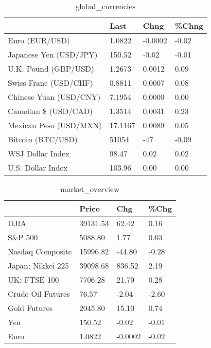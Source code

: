 \documentclass{article}%
\begin{document}
%


\begin{table}[htbp]%
\caption{global\_currencies}%
\centering%
\begin{adjustbox}{width=1\textwidth}%
\begin{tabular}{llll}
\toprule
                       &    Last &    Chng & \%Chng \\
\midrule
        Euro (EUR/USD) &  1.0822 & -0.0002 & -0.02 \\
Japanese Yen (USD/JPY) &  150.52 &   -0.02 & -0.01 \\
  U.K. Pound (GBP/USD) &  1.2673 &  0.0012 &  0.09 \\
 Swiss Franc (USD/CHF) &  0.8811 &  0.0007 &  0.08 \\
Chinese Yuan (USD/CNY) &  7.1954 &  0.0000 &  0.00 \\
  Canadian \$ (USD/CAD) &  1.3514 &  0.0031 &  0.23 \\
Mexican Peso (USD/MXN) & 17.1167 &  0.0089 &  0.05 \\
     Bitcoin (BTC/USD) &   51054 &     -47 & -0.09 \\
      WSJ Dollar Index &   98.47 &    0.02 &  0.02 \\
     U.S. Dollar Index &  103.96 &    0.00 &  0.00 \\
\bottomrule
\end{tabular}
%
\end{adjustbox}%
\end{table}

%


\begin{table}[htbp]%
\caption{market\_overview}%
\centering%
\begin{adjustbox}{width=1\textwidth}%
\begin{tabular}{llll}
\toprule
                  &    Price &     Chg &  \%Chg \\
\midrule
             DJIA & 39131.53 &   62.42 &  0.16 \\
          S\&P 500 &  5088.80 &    1.77 &  0.03 \\
 Nasdaq Composite & 15996.82 &  -44.80 & -0.28 \\
Japan: Nikkei 225 & 39098.68 &  836.52 &  2.19 \\
     UK: FTSE 100 &  7706.28 &   21.79 &  0.28 \\
Crude Oil Futures &    76.57 &   -2.04 & -2.60 \\
     Gold Futures &  2045.80 &   15.10 &  0.74 \\
              Yen &   150.52 &   -0.02 & -0.01 \\
             Euro &   1.0822 & -0.0002 & -0.02 \\
\bottomrule
\end{tabular}
%
\end{adjustbox}%
\end{table}

%
\end{document}
